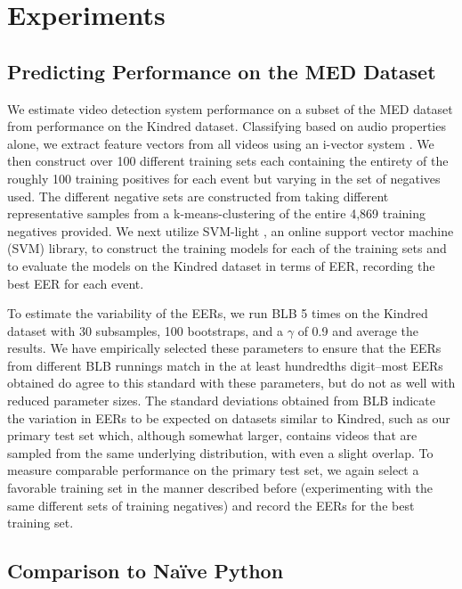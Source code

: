 
\section{Experiments}

\subsection{Predicting Performance on the MED Dataset}

We estimate video detection system performance on a subset of the MED dataset from performance on the Kindred dataset.
Classifying based on audio properties alone, we extract feature vectors from all videos using an i-vector system \cite{elizalde2013ivector}.
We then construct over 100 different training sets each containing the entirety of the roughly 100 training positives for each event but varying in the set of negatives used. The different negative sets are constructed from taking different representative samples from a k-means-clustering of the entire 4,869 training negatives provided.
We next utilize SVM-light \cite{svm}, an online support vector machine (SVM) library, to construct the training models for each of the training sets and to evaluate the models on the Kindred dataset in terms of EER, recording the best EER for each event.

To estimate the variability of the EERs, we run BLB 5 times on the Kindred dataset with 30 subsamples, 100 bootstraps, and a $\gamma$ of 0.9 and average the results. We have empirically selected these parameters to ensure that the EERs from different BLB runnings match in the at least hundredths digit--most EERs obtained do agree to this standard with these parameters, but do not as well with reduced parameter sizes. 
The standard deviations obtained from BLB indicate the variation in EERs to be expected on datasets similar to Kindred, such as our primary test set which, although somewhat larger, contains videos that are sampled from the same underlying distribution, with even a slight overlap. 
To measure comparable performance on the primary test set, we again select a favorable training set in the manner described before (experimenting with the same different sets of training negatives) and record the EERs for the best training set. 

\subsection{Comparison to Na\"ive Python}

